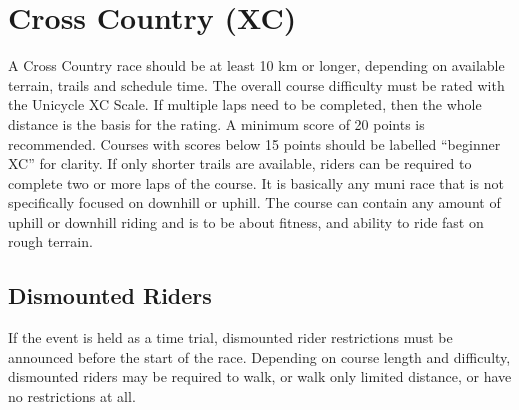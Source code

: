 \section{Cross Country (XC)\label{sec:muni_xc}}
A Cross Country race should be at least 10 km or longer, depending on available terrain, trails and schedule time.
The overall course difficulty must be rated with the Unicycle XC Scale.
If multiple laps need to be completed, then the whole distance is the basis for the rating.
A minimum score of  20 points is  recommended. Courses with scores below 15 points should be labelled ``beginner XC'' for clarity.
If only shorter trails are available, riders can be required to complete two or more laps of the course.
It is basically any muni race that is not specifically focused on downhill or uphill.
The course can contain any amount of uphill or downhill riding and is to be about fitness, and ability to ride fast on rough terrain.

\subsection{Dismounted Riders}
If the event is held as a time trial, dismounted rider restrictions must be announced before the start of the race.
Depending on course length and difficulty, dismounted riders may be required to walk, or walk only limited distance, or have no restrictions at all.

